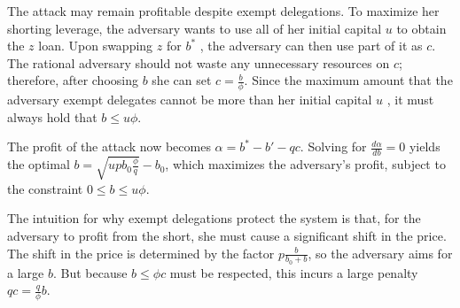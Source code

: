 The attack may remain profitable despite exempt delegations.
To maximize her shorting leverage, the adversary wants to use all
of her initial capital $u$ \asset to obtain the $z$ \stasset loan.
Upon swapping $z$ for $b^*$ \asset, the adversary can then use part of it as $c$.
The rational adversary should not waste any unnecessary resources on
$c$; therefore, after choosing $b$ she can set $c = \frac{b}{\phi}$.
Since the maximum amount that the adversary exempt delegates
cannot be more than her initial capital $u$ \asset,
it must always hold that $b \leq u\phi$.

The profit of the attack now becomes $\alpha = b^* - b' - qc$.
Solving for $\frac{d\alpha}{db} = 0$ yields the optimal $b = \sqrt{u p b_0 \frac{\phi}{q}} - b_0$,
which maximizes
the adversary's profit, subject to the constraint
$0 \leq b \leq u\phi$.


The intuition for why exempt delegations protect the system is that,
for the adversary to profit from the short, she must cause a significant
shift in the price. The shift in the price is determined by the factor
$p\frac{b}{b_0 + b}$, so the adversary aims for a large $b$. But because $b \leq \phi c$
must be respected, this incurs a large penalty $qc = \frac{q}{\phi}b$.

%



